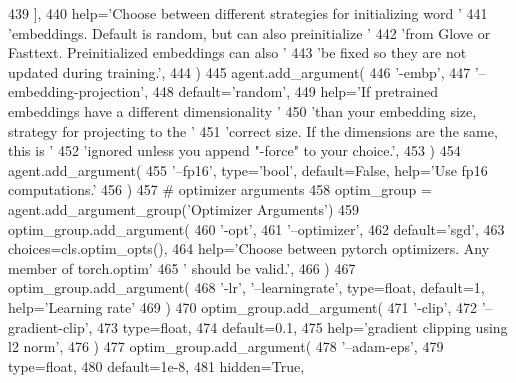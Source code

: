 \begin{DoxyCode}
439             ],
440             help=\textcolor{stringliteral}{'Choose between different strategies for initializing word '}
441             \textcolor{stringliteral}{'embeddings. Default is random, but can also preinitialize '}
442             \textcolor{stringliteral}{'from Glove or Fasttext. Preinitialized embeddings can also '}
443             \textcolor{stringliteral}{'be fixed so they are not updated during training.'},
444         )
445         agent.add\_argument(
446             \textcolor{stringliteral}{'-embp'},
447             \textcolor{stringliteral}{'--embedding-projection'},
448             default=\textcolor{stringliteral}{'random'},
449             help=\textcolor{stringliteral}{'If pretrained embeddings have a different dimensionality '}
450             \textcolor{stringliteral}{'than your embedding size, strategy for projecting to the '}
451             \textcolor{stringliteral}{'correct size. If the dimensions are the same, this is '}
452             \textcolor{stringliteral}{'ignored unless you append "-force" to your choice.'},
453         )
454         agent.add\_argument(
455             \textcolor{stringliteral}{'--fp16'}, type=\textcolor{stringliteral}{'bool'}, default=\textcolor{keyword}{False}, help=\textcolor{stringliteral}{'Use fp16 computations.'}
456         )
457         \textcolor{comment}{# optimizer arguments}
458         optim\_group = agent.add\_argument\_group(\textcolor{stringliteral}{'Optimizer Arguments'})
459         optim\_group.add\_argument(
460             \textcolor{stringliteral}{'-opt'},
461             \textcolor{stringliteral}{'--optimizer'},
462             default=\textcolor{stringliteral}{'sgd'},
463             choices=cls.optim\_opts(),
464             help=\textcolor{stringliteral}{'Choose between pytorch optimizers. Any member of torch.optim'}
465             \textcolor{stringliteral}{' should be valid.'},
466         )
467         optim\_group.add\_argument(
468             \textcolor{stringliteral}{'-lr'}, \textcolor{stringliteral}{'--learningrate'}, type=float, default=1, help=\textcolor{stringliteral}{'Learning rate'}
469         )
470         optim\_group.add\_argument(
471             \textcolor{stringliteral}{'-clip'},
472             \textcolor{stringliteral}{'--gradient-clip'},
473             type=float,
474             default=0.1,
475             help=\textcolor{stringliteral}{'gradient clipping using l2 norm'},
476         )
477         optim\_group.add\_argument(
478             \textcolor{stringliteral}{'--adam-eps'},
479             type=float,
480             default=1e-8,
481             hidden=\textcolor{keyword}{True},

\end{DoxyCode}
